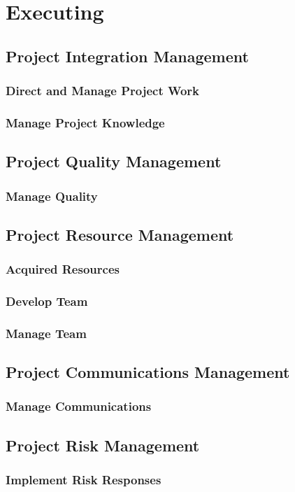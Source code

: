 \documentclass[12pt,letterpaper]{report}
\begin{document}
		
	\part{Executing}
	\chapter{Project Integration Management}
	\section{Direct and Manage Project Work}
	\section{Manage Project Knowledge}
	\chapter{Project Quality Management}
	\section{Manage Quality}
	\chapter{Project Resource Management}
	\section{Acquired Resources}
	\section{Develop Team}
	\section{Manage Team}
	\chapter{Project Communications Management}
	\section{Manage Communications}
	\chapter{Project Risk Management}
	\section{Implement Risk Responses}
\end{document}
